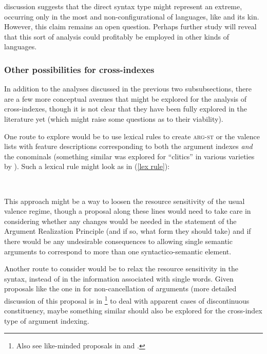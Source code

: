 \documentclass[output=paper
 	        ,biblatex
                ,babelshorthands
                ,newtxmath
                ,draftmode
                ,colorlinks, citecolor=brown
]{langscibook}
\begin{document}
 discussion suggests that the direct syntax type might represent an extreme, occurring only in the most  and non-configurational  of languages, like  and its  kin. However, this claim remains an open question. Perhaps further study will reveal that this sort of analysis could profitably be employed in other kinds of languages.  

\subsubsection{Other possibilities for cross-indexes} \label{other poss for cross}

In addition to the analyses discussed in the previous two subsubsections, there are a few more conceptual avenues that might be explored for the analysis of cross-indexes, though it is not clear that they have been fully explored in the literature yet (which might raise some questions as to their viability). 

One route to explore would be to use lexical rules to create \textsc{arg-st} or the valence lists with feature descriptions corresponding to both the argument indexes \emph{and} the conominals (something similar was explored for ``clitics'' in various  varieties by \citealt{monachesi05}). Such a lexical rule might look as in (\ref{lex rule}):
%
\begin{exe}
\ex \label{lex rule}
 \\								 
\flushright	
{}
\end{exe}

\noindent
This approach might be a way to loosen the resource sensitivity of the usual valence regime, though a proposal along these lines would need to take care in considering whether any changes would be needed in the statement of the Argument Realization Principle (and if so, what form they should take) and if there would be any undesirable consequences to allowing single semantic arguments to correspond to more than one syntactico-semantic element.    

Another route to consider would be to relax the resource sensitivity in the syntax, instead of in the information associated with single words. Given proposals like the one in \citet{Bender2008a} for non-cancellation of arguments (more detailed discussion of this proposal is in \footnote{Also see like-minded proposals in \citet{Meurers99b} and \citet{Mueller2008a}.} to deal with apparent cases of discontinuous constituency, maybe something similar should also be explored for the cross-index type of argument indexing. 
\end{document}
